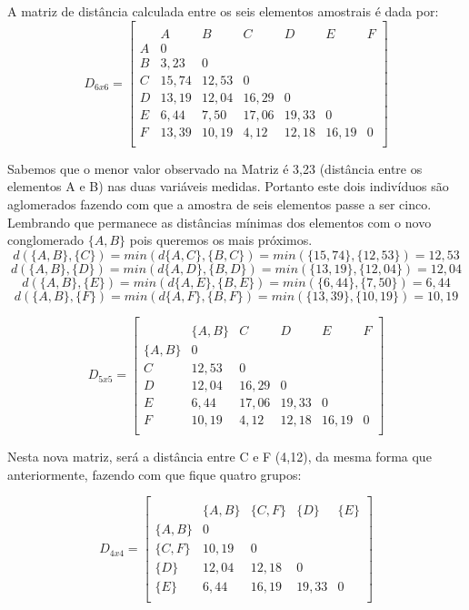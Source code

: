 \documentclass[
  openany]{book}
\begin{document}
A matriz de distância calculada entre os seis elementos amostrais é dada por:
\[D_{6x6}=\begin{bmatrix}\\
 &A&B&C&D&E&F \\
 A&0&&&&&\\
 B&3,23&0&&&&\\
 C & 15,74& 12,53&0&&&\\
 D& 13,19& 12,04& 16,29&0&&\\
 E& 6,44& 7,50& 17,06& 19,33&0&\\
 F& 13,39& 10,19& 4,12& 12,18& 16,19&0 \\
\end{bmatrix}\]

Sabemos que o menor valor observado na Matriz é 3,23 (distância entre os elementos A e B) nas duas variáveis medidas. Portanto este dois indivíduos são aglomerados fazendo com que a amostra de seis elementos passe a ser cinco. Lembrando que permanece as distâncias mínimas dos elementos com o novo conglomerado \(\{A,B\}\) pois queremos os mais próximos.
\[d(\{A,B\},\{C\})=min(d\{A,C\},\{B,C\})=min(\{15,74\},\{12,53\})=12,53\]
\[d(\{A,B\},\{D\})=min(d\{A,D\},\{B,D\})=min(\{13,19\},\{12,04\})=12,04\]
\[d(\{A,B\},\{E\})=min(d\{A,E\},\{B,E\})=min(\{6,44\},\{7,50\})=6,44\]
\[d(\{A,B\},\{F\})=min(d\{A,F\},\{B,F\})=min(\{13,39\},\{10,19\})=10,19\]

\[D_{5x5}=\begin{bmatrix}\\
 &\{A,B\}&C&D&E&F \\
 \{A,B\}&0&&&&\\
 C & 12,53&0&&&\\
 D& 12,04& 16,29&0&&\\
 E& 6,44& 17,06& 19,33&0&\\
 F& 10,19& 4,12& 12,18& 16,19&0 \\
\end{bmatrix}\]

Nesta nova matriz, será a distância entre C e F (4,12), da mesma forma que anteriormente, fazendo com que fique quatro grupos:

\[D_{4x4}=\begin{bmatrix}\\
 &\{A,B\}& \{C,F\}&\{D\}&\{E\} \\
 \{A,B\}&0&&\\
 \{C,F\} & 10,19&0&&\\
 \{D\}& 12,04& 12,18&0&\\
 \{E\}& 6,44& 16,19& 19,33&0\\
\end{bmatrix}\]
\end{document}
